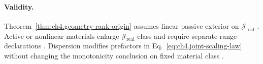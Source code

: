 \paragraph{Validity.}
Theorem~\ref{thm:ch4.geometry-rank-origin} assumes linear passive exterior on \(\mathcal{J}_{\mathrm{real}}\) \cite{stratton1941}. Active or nonlinear materials
enlarge \(\mathcal{J}_{\mathrm{real}}\) class and require separate range declarations \cite{harrington2001,devaney2004}. Dispersion modifies prefactors in
Eq.~\eqref{eq:ch4.joint-scaling-law} without changing the monotonicity conclusion on fixed material class \cite{jackson1999,hansen1988,collin2001}.
